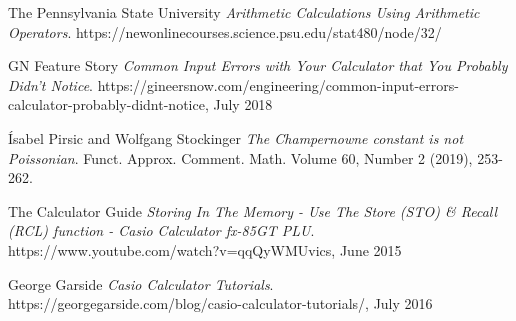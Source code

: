 \documentclass[10pt]{article}
\begin{document}
\pagebreak
\begin{thebibliography}{9}
The Pennsylvania State University
\textit{Arithmetic Calculations Using Arithmetic Operators}. 
https://newonlinecourses.science.psu.edu/stat480/node/32/

GN Feature Story
\textit{Common Input Errors with Your Calculator that You Probably Didn’t Notice}. 
https://gineersnow.com/engineering/common-input-errors-calculator-probably-didnt-notice, July 2018

Ísabel Pirsic and Wolfgang Stockinger
\textit{The Champernowne constant is not Poissonian}. 
Funct. Approx. Comment. Math. Volume 60, Number 2 (2019), 253-262.

The Calculator Guide
\textit{Storing In The Memory - Use The Store (STO) \& Recall (RCL) function - Casio Calculator fx-85GT PLU}. 
https://www.youtube.com/watch?v=qqQyWMUvics, June 2015


George Garside
\textit{Casio Calculator Tutorials}. 
https://georgegarside.com/blog/casio-calculator-tutorials/, July 2016



\end{thebibliography}
\end{document}
